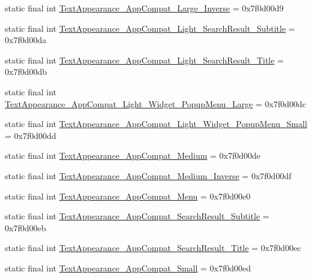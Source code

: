 \begin{DoxyCompactItemize}
static final int \mbox{\hyperlink{classcom_1_1google_1_1android_1_1gms_1_1R_1_1style_a71ff4354b5f57d4ed28406db5e5c4de4}{Text\+Appearance\+\_\+\+App\+Compat\+\_\+\+Large\+\_\+\+Inverse}} = 0x7f0d00d9
\item 
static final int \mbox{\hyperlink{classcom_1_1google_1_1android_1_1gms_1_1R_1_1style_a7be3e4d36b23df3e20c62ed4f289e7d6}{Text\+Appearance\+\_\+\+App\+Compat\+\_\+\+Light\+\_\+\+Search\+Result\+\_\+\+Subtitle}} = 0x7f0d00da
\item 
static final int \mbox{\hyperlink{classcom_1_1google_1_1android_1_1gms_1_1R_1_1style_aeb1ae2801e02ce92966ef8ad9551cb59}{Text\+Appearance\+\_\+\+App\+Compat\+\_\+\+Light\+\_\+\+Search\+Result\+\_\+\+Title}} = 0x7f0d00db
\item 
static final int \mbox{\hyperlink{classcom_1_1google_1_1android_1_1gms_1_1R_1_1style_aec026e3b62ba8e9bba71cebea26ab695}{Text\+Appearance\+\_\+\+App\+Compat\+\_\+\+Light\+\_\+\+Widget\+\_\+\+Popup\+Menu\+\_\+\+Large}} = 0x7f0d00dc
\item 
static final int \mbox{\hyperlink{classcom_1_1google_1_1android_1_1gms_1_1R_1_1style_abd394e59ccf003f5b831ba25d2dc9dc3}{Text\+Appearance\+\_\+\+App\+Compat\+\_\+\+Light\+\_\+\+Widget\+\_\+\+Popup\+Menu\+\_\+\+Small}} = 0x7f0d00dd
\item 
static final int \mbox{\hyperlink{classcom_1_1google_1_1android_1_1gms_1_1R_1_1style_a3087578fe3c2e548bca7ec1917f0821a}{Text\+Appearance\+\_\+\+App\+Compat\+\_\+\+Medium}} = 0x7f0d00de
\item 
static final int \mbox{\hyperlink{classcom_1_1google_1_1android_1_1gms_1_1R_1_1style_a175b04ebf2c6097a38ae7585f9a020b5}{Text\+Appearance\+\_\+\+App\+Compat\+\_\+\+Medium\+\_\+\+Inverse}} = 0x7f0d00df
\item 
static final int \mbox{\hyperlink{classcom_1_1google_1_1android_1_1gms_1_1R_1_1style_a860cf952f32ebc7d7c377c0e3c10a110}{Text\+Appearance\+\_\+\+App\+Compat\+\_\+\+Menu}} = 0x7f0d00e0
\item 
static final int \mbox{\hyperlink{classcom_1_1google_1_1android_1_1gms_1_1R_1_1style_a3f84c3110b41b8a244d3d6373f621cd1}{Text\+Appearance\+\_\+\+App\+Compat\+\_\+\+Search\+Result\+\_\+\+Subtitle}} = 0x7f0d00eb
\item 
static final int \mbox{\hyperlink{classcom_1_1google_1_1android_1_1gms_1_1R_1_1style_a016fe98b63b58150cd224df3001d164e}{Text\+Appearance\+\_\+\+App\+Compat\+\_\+\+Search\+Result\+\_\+\+Title}} = 0x7f0d00ec
\item 
static final int \mbox{\hyperlink{classcom_1_1google_1_1android_1_1gms_1_1R_1_1style_a8f7676804012d3917f50d922c2d3e959}{Text\+Appearance\+\_\+\+App\+Compat\+\_\+\+Small}} = 0x7f0d00ed

\end{DoxyCompactItemize}
